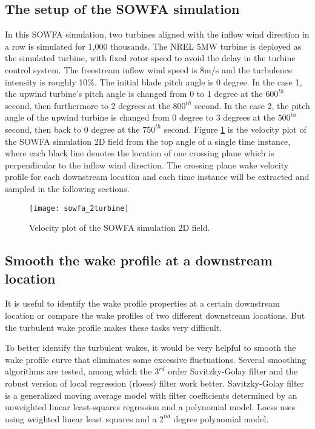 \documentclass{umthesis}
\begin{document}
\subsection{The setup of the SOWFA simulation}
In this SOWFA simulation, two turbines aligned with the inflow wind direction in a row is simulated for 1,000 thousands. The NREL 5MW turbine is deployed as the simulated turbine, with fixed rotor speed to avoid the delay in the turbine control system. The freestream inflow wind speed is 8m/s and the turbulence intensity is roughly 10\%. The initial blade pitch angle is 0 degree. In the case 1, the upwind turbine's pitch angle is changed from 0 to 1 degree at the $600^{th}$ second, then furthermore to 2 degrees at the $800^{th}$ second. In the case 2, the pitch angle of the upwind turbine is changed from 0 degree to 3 degrees at the $500^{th}$ second, then back to 0 degree at the $750^{th}$ second. Figure \ref{fig:sowfa_2turbine} is the velocity plot of the SOWFA simulation 2D field from the top angle of a single time instance, where each black line denotes the location of one crossing plane which is perpendicular to the inflow wind direction. The crossing plane wake velocity profile for each downstream location and each time instance will be extracted and sampled in the following sections.

\begin{figure}
  \centering
  \texttt{[image: sowfa\_2turbine]}
  \caption{Velocity plot of the SOWFA simulation 2D field.}\label{fig:sowfa_2turbine}
\end{figure}


\subsection{Smooth the wake profile at a downstream location}
It is useful to identify the wake profile properties at a certain downstream location or compare the wake profiles of two different downstream locations. But the turbulent wake profile makes these tasks very difficult.

To better identify the turbulent wakes, it would be very helpful to smooth the wake profile curve that eliminates some excessive fluctuations. Several smoothing algorithms are tested, among which the $3^{rd}$ order Savitzky-Golay filter \cite{Savitzky} and the robust version of local regression (rloess) filter \cite{Cleveland} work better. Savitzky-Golay filter is a generalized moving average model with filter coefficients determined by an unweighted linear least-squares regression and a polynomial model. Loess uses using weighted linear least squares and a $2^{nd}$ degree polynomial model. 
\end{document}
